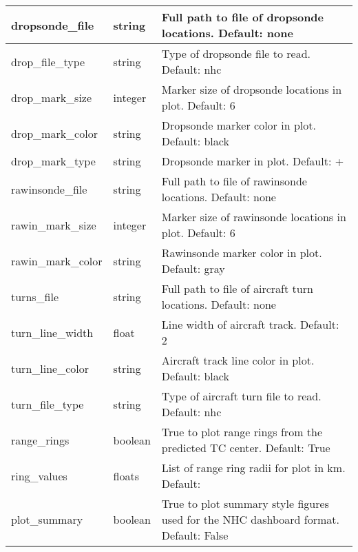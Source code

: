 \documentclass[psfig,12pt]{article}
\begin{document}
\begin{table}[H]
\begin{center}
\begin{tabular}{|p{1.60in}|p{0.5in}|p{4.15in}|}
dropsonde\_file & string & Full path to file of dropsonde locations.  Default:  none \\ \hline

drop\_file\_type & string & Type of dropsonde file to read. Default: nhc \\ \hline

drop\_mark\_size & integer &  Marker size of dropsonde locations in plot.  Default:  6 \\ \hline

drop\_mark\_color & string & Dropsonde marker color in plot.  Default: black \\ \hline

drop\_mark\_type & string & Dropsonde marker in plot.  Default: + \\ \hline

rawinsonde\_file & string & Full path to file of rawinsonde locations.  Default:  none \\ \hline

rawin\_mark\_size & integer & Marker size of rawinsonde locations in plot.  Default:  6 \\ \hline

rawin\_mark\_color & string & Rawinsonde marker color in plot.  Default: gray \\ \hline

turns\_file & string & Full path to file of aircraft turn locations.  Default:  none \\ \hline

turn\_line\_width & float & Line width of aircraft track.  Default: 2 \\ \hline

turn\_line\_color & string & Aircraft track line color in plot.  Default: black \\ \hline

turn\_file\_type & string & Type of aircraft turn file to read.  Default: nhc \\ \hline

range\_rings & boolean & True to plot range rings from the predicted TC center.  Default: True \\ \hline

ring\_values & floats & List of range ring radii for plot in km.  Default:  \\ \hline

plot\_summary & boolean & True to plot summary style figures used for the NHC 
dashboard format.  Default: False \\ \hline


\end{tabular}
\end{center}
\end{table}
\end{document}
